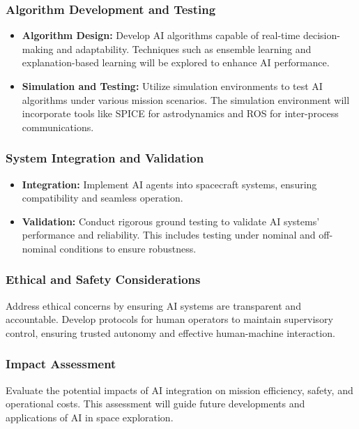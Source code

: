 \documentclass[a4paper, 11pt]{article}
\begin{document}
\subsubsection{Algorithm Development and Testing}

\begin{itemize}
    \item \textbf{Algorithm Design:} Develop AI algorithms capable of real-time decision-making and adaptability. Techniques such as ensemble learning and explanation-based learning will be explored to enhance AI performance.
    \item \textbf{Simulation and Testing:} Utilize simulation environments to test AI algorithms under various mission scenarios. The simulation environment will incorporate tools like SPICE for astrodynamics and ROS for inter-process communications.
\end{itemize}

\subsubsection{System Integration and Validation}

\begin{itemize}
    \item \textbf{Integration:} Implement AI agents into spacecraft systems, ensuring compatibility and seamless operation.
    \item \textbf{Validation:} Conduct rigorous ground testing to validate AI systems' performance and reliability. This includes testing under nominal and off-nominal conditions to ensure robustness.
\end{itemize}

\subsubsection{Ethical and Safety Considerations}

Address ethical concerns by ensuring AI systems are transparent and accountable. Develop protocols for human operators to maintain supervisory control, ensuring trusted autonomy and effective human-machine interaction.

\subsubsection{Impact Assessment}

Evaluate the potential impacts of AI integration on mission efficiency, safety, and operational costs. This assessment will guide future developments and applications of AI in space exploration.
\end{document}
